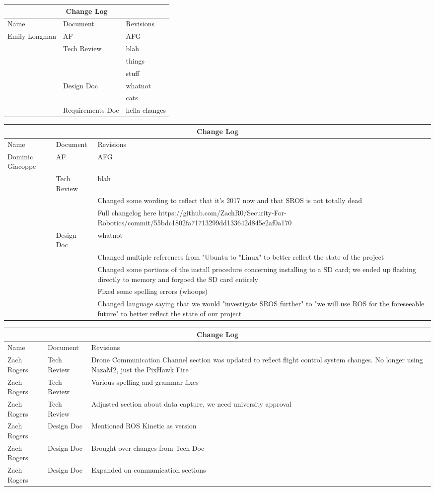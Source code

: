 \documentclass[IEEEtran,letterpaper,10pt,titlepage,draftclsnofoot,onecolumn]{article}
\begin{document}
\begin{tabular}{ |p{3cm}|p{3cm}|p{3cm}|  }
\hline
\multicolumn{3}{|c|}{Change Log} \\
\hline
Name & Document & Revisions \\
\hline
Emily Longman & AF &AFG \\
& Tech Review & blah \\
& & things \\
& & stuff \\
& Design Doc & whatnot \\
& & cats \\
& Requirements Doc & hella changes \\
\hline
\end{tabular}

\begin{tabular}{ |p{3cm}|p{3cm}|p{3cm}|  }
\hline
\multicolumn{3}{|c|}{Change Log} \\
\hline
Name & Document & Revisions \\
\hline
Dominic Giacoppe & AF &AFG \\
& Tech Review & blah \\
& & Changed some wording to reflect that it's 2017 now and that SROS is not totally dead \\
& & Full changelog here https://github.com/ZachR0/Security-For-Robotics/commit/55bdc1802fa71713299dd133642d845e2af0a170 \\
& Design Doc & whatnot \\
& & Changed multiple references from "Ubuntu to "Linux" to better reflect the state of the project \\
& & Changed some portions of the install procedure concerning installing to a SD card; we ended up flashing directly to memory and forgoed the SD card entirely \\
& & Fixed some spelling errors (whoops) \\
& & Changed language saying that we would "investigate SROS further" to "we will use ROS for the foreseeable future" to better reflect the state of our project \\
\hline
\end{tabular}

\begin{tabular}{ |p{3cm}|p{3cm}|p{3cm}|  }
\hline
\multicolumn{3}{|c|}{Change Log} \\
\hline
Name & Document & Revisions \\
\hline
Zach Rogers & Tech Review & Drone Communication Channel section was updated to reflect flight control system changes. No longer using NazaM2, just the PixHawk Fire \\
Zach Rogers & Tech Review & Various spelling and grammar fixes \\
Zach Rogers & Tech Review & Adjusted section about data capture, we need university approval \\
Zach Rogers & Design Doc & Mentioned ROS Kinetic as version \\
Zach Rogers & Design Doc & Brought over changes from Tech Doc \\
Zach Rogers & Design Doc & Expanded on communication sections \\
\hline
\end{tabular}
\end{document}
